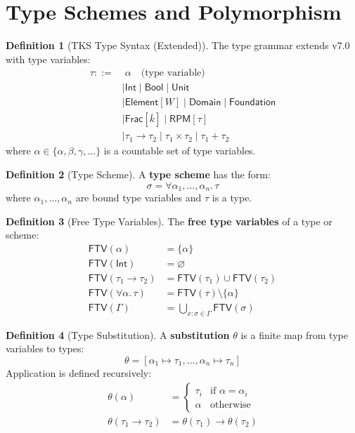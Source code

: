 \documentclass[11pt,twoside,openright]{book}
\theoremstyle{definition}
\newtheorem{definition}{Definition}[chapter]
\theoremstyle{plain}
\theoremstyle{remark}
\newcommand{\TypeScheme}{\sigma}             %
\newcommand{\TypeVar}{\alpha}                %
\newcommand{\Subst}{\theta}                  %
\newcommand{\FTV}{\mathsf{FTV}}              %
\begin{document}
\section{Type Schemes and Polymorphism}

\begin{definition}[TKS Type Syntax (Extended)]
\label{def:tks-type-syntax-ext}
The type grammar extends v7.0 with type variables:
\begin{align}
\tau ::=&\; \TypeVar \quad \text{(type variable)} \\
    &\mid \mathsf{Int} \mid \mathsf{Bool} \mid \mathsf{Unit} \\
    &\mid \mathsf{Element}[W] \mid \mathsf{Domain} \mid \mathsf{Foundation} \\
    &\mid \mathsf{Frac}[\bar{k}] \mid \mathsf{RPM}[\tau] \\
    &\mid \tau_1 \to \tau_2 \mid \tau_1 \times \tau_2 \mid \tau_1 + \tau_2
\end{align}
where $\TypeVar \in \{\alpha, \beta, \gamma, \ldots\}$ is a countable set of type variables.
\end{definition}

\begin{definition}[Type Scheme]
\label{def:type-scheme}
A \textbf{type scheme} has the form:
\[
\TypeScheme = \forall \alpha_1, \ldots, \alpha_n.\, \tau
\]
where $\alpha_1, \ldots, \alpha_n$ are bound type variables and $\tau$ is a type.
\end{definition}

\begin{definition}[Free Type Variables]
\label{def:free-type-vars}
The \textbf{free type variables} of a type or scheme:
\begin{align}
\FTV(\TypeVar) &= \{\TypeVar\} \\
\FTV(\mathsf{Int}) &= \varnothing \\
\FTV(\tau_1 \to \tau_2) &= \FTV(\tau_1) \cup \FTV(\tau_2) \\
\FTV(\forall \alpha.\, \tau) &= \FTV(\tau) \setminus \{\alpha\} \\
\FTV(\Gamma) &= \bigcup_{x : \TypeScheme \in \Gamma} \FTV(\TypeScheme)
\end{align}
\end{definition}

\begin{definition}[Type Substitution]
\label{def:type-substitution}
A \textbf{substitution} $\Subst$ is a finite map from type variables to types:
\[
\Subst = [\alpha_1 \mapsto \tau_1, \ldots, \alpha_n \mapsto \tau_n]
\]
Application is defined recursively:
\begin{align}
\Subst(\TypeVar) &= \begin{cases} \tau_i & \text{if } \TypeVar = \alpha_i \\ \TypeVar & \text{otherwise} \end{cases} \\
\Subst(\tau_1 \to \tau_2) &= \Subst(\tau_1) \to \Subst(\tau_2)
\end{align}
\end{definition}
\end{document}
